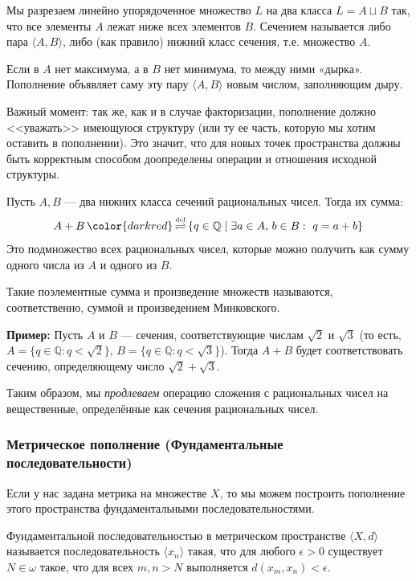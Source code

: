 \documentclass[11pt, a4paper]{extarticle}
\renewcommand{\eqdef}{\ifmmode{\,\color{darkred}\mathop{\overset{\text{\tiny def}}{\rightleftharpoons}}\,}\fi}%
\newcommand{\eqdef}{\,\mathop{\color{darkred}\overset{\text{\tiny def}}{\rightleftharpoons}}\,}
\newcommand{\om}{\omega}
\newcommand{\Q}{{\mathbb Q}}
\begin{document}
        
    \begin{definition}[Сечение]
    Мы разрезаем линейно упорядоченное множество $L$ на два класса $L=A\sqcup B$ так, что все элементы $A$ лежат ниже всех элементов $B$. Сечением называется либо пара $\langle A, B\rangle$, либо (как правило) нижний класс сечения, т.е. множество $A$.
    \end{definition}
    Если в $A$ нет максимума, а в $B$ нет минимума, то между ними «дырка». Пополнение объявляет саму эту пару $\langle A, B\rangle$ новым числом, заполняющим дыру.

    Важный момент: так же, как и в случае факторизации, пополнение должно <<уважать>> имеющуюся структуру (или ту ее часть, которую мы хотим оставить в пополнении). Это значит, что для новых точек пространства должны быть корректным способом доопределены операции и отношения исходной структуры.
    
\begin{example}
Пусть $A, B$ --- два нижних класса сечений рациональных чисел. Тогда их сумма:
\[ A + B \eqdef \{ q \in \Q \mid \exists a \in A,\, b \in B:\ q = a + b \} \]
Это подмножество всех рациональных чисел, которые можно получить как сумму одного числа из $A$ и одного из $B$.

Такие поэлементные сумма и произведение множеств называются, соответственно, суммой и произведением Минковского.

\textbf{Пример:} Пусть $A$ и $B$ --- сечения, соответствующие числам $\sqrt{2}$ и $\sqrt{3}$ (то есть, $A = \{q \in \Q: q < \sqrt{2}\}$, $B = \{q \in \Q: q < \sqrt{3}\}$). Тогда $A+B$ будет соответствовать сечению, определяющему число $\sqrt{2}+\sqrt{3}$.

Таким образом, мы \emph{продлеваем} операцию сложения с рациональных чисел на вещественные, определённые как сечения рациональных чисел.
\end{example}
    
\subsubsection{Метрическое пополнение (Фундаментальные последовательности)}

Если у нас задана метрика на множестве $X$, то мы можем построить пополнение этого пространства фундаментальными последовательностями.

\begin{definition}
Фундаментальной последовательностью в метрическом пространстве $\langle X, d \rangle$ называется последовательность $\langle x_n \rangle$ такая, что для любого $\epsilon > 0$ существует $N\in\om$ такое, что для всех $m, n > N$ выполняется $d(x_m, x_n) < \epsilon$.
\end{definition}
\end{document}
